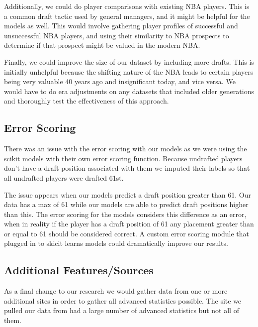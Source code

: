 \documentclass{article}
\begin{document}
Additionally, we could do player comparisons with existing NBA players. This is
a common draft tactic used by general managers, and it might be helpful for the
models as well. This would involve gathering player profiles of successful and
unsuccessful NBA players, and using their similarity to NBA prospects to
determine if that prospect might be valued in the modern NBA.

Finally, we could improve the size of our dataset by including more drafts. This
is initially unhelpful because the shifting nature of the NBA leads to certain
players being very valuable 40 years ago and insignificant today, and vice
versa. We would have to do era adjustments on any datasets that included older
generations and thoroughly test the effectiveness of this approach.

\subsection{Error Scoring}

There was an issue with the error scoring with our models as we were using the
scikit models with their own error scoring function. Because undrafted players
don’t have a draft position associated with them we imputed their labels so that
all undrafted players were drafted 61st. 

The issue appears when our models predict a draft position greater than 61. Our
data has a max of 61 while our models are able to predict draft positions higher
than this. The error scoring for the models considers this difference as an
error, when in reality if the player has a draft position of 61 any placement
greater than or equal to 61 should be considered correct. A custom error scoring
module that plugged in to skicit learns models could dramatically improve our
results.

\subsection{Additional Features/Sources}

As a final change to our research we would gather data from one or more
additional sites in order to gather all advanced statistics possible. The site
we pulled our data from had a large number of advanced statistics but not all of
them.
\end{document}
